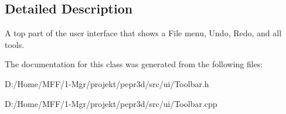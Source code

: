 \subsection{Detailed Description}
A top part of the user interface that shows a File menu, Undo, Redo, and all tools. 

The documentation for this class was generated from the following files\+:\begin{DoxyCompactItemize}
\item 
D\+:/\+Home/\+M\+F\+F/1-\/\+Mgr/projekt/pepr3d/src/ui/Toolbar.\+h\item 
D\+:/\+Home/\+M\+F\+F/1-\/\+Mgr/projekt/pepr3d/src/ui/Toolbar.\+cpp\end{DoxyCompactItemize}
